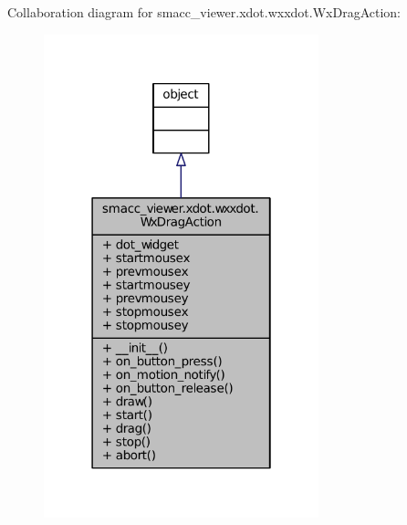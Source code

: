 Collaboration diagram for smacc\+\_\+viewer.\+xdot.\+wxxdot.\+Wx\+Drag\+Action\+:
\nopagebreak
\begin{figure}[H]
\begin{center}
\leavevmode
\includegraphics[width=226pt]{classsmacc__viewer_1_1xdot_1_1wxxdot_1_1WxDragAction__coll__graph}
\end{center}
\end{figure}
